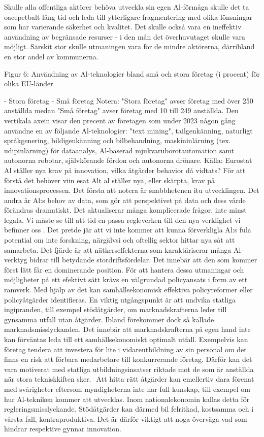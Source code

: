 {{{{{{{{{{{{{{{{{{Skulle alla offentliga aktörer behöva utveckla sin egen Al-förmåga skulle det ta oacepetbalt lång tid och leda till ytterligare fragmentering med olika lönsningar som har varierande säkerhet och kvalitet. Det skulle också vara en ineffektiv användning av begränsade resurser - i den mån det överhuvutaget skulle vara möjligt. Särskit stor skulle utmaningen vara för de mindre aktörerna, därribland en stor andel av kommunerna.

Figur 6: Användning av Al-teknologier bland små och stora företag (i procent) för olika EU-länder

- Stora företag - Små företag
Notera: "Stora företag" avser företag med över 250 anställda medan "Små företag" avser företag med 10 till 249 anställda. Den vertikala axein visar den precent av företagen som under 2023 någon gång användne en av följande Al-teknologier: "text mining", tailgenkänning, naturligt språkgenering, bildigenkänning och bilbehandning, maskininlärning (tex. udipinlärning) för dataanalys, Al-baserad mjukvaruborotautomation samt autonorna robotar, självkörande fördon och autonorna drönare.
Källa: Eurostat
Al ställer nya krav på innovation, vilka åtgärder behavior då vidtats? För att förstå det behöver viin esat Alt al ställer nya, eller skärpta, krav på innovationsprocessen. Det första att notera är snabbhetenen itu utvecklingen. Det andra år Al:s behov av data, som gör att perspektivet på data och dess värde förändras dramatiskt. Det aktualiserar många komplicerade frågor, inte minst legala. Vi måste se till att tid en passa regleverken till den nya verklighet vi befinner oss . Det pretde jär att vi inte kommer att kunna förverkligla Al:s fula potential om inte forskning, närgälvsi och oftellig sektor hittar nya såt att samarbeta. Det fjärde är att nätkerseffekterna som karaktäriserar många Al-verktyg bidrar till betydande stordriftsfördelar. Det innebär att den som kommer först lätt får en dominerande position.
För att hantera dessa utmaningar och möjligheter på ett efektivt sätt krävs en välgrundad policyansats i form av ett ramverk. Med hjälp av det kan samhällsekonomisk effektiva policyreformer eller policyåtgärder identifieras. En viktig utgångspunkt är att undvika statliga ingipranden, till exempel stödåtgärder, om marknadskrafterna leder till gynsamma utfall utan åtgärder. Ibland förekommer dock så kallade marknadsmisslyckanden. Det innebär att marknadskrafterna på egen hand inte kan förväntas leda till ett samhällsekonomiskt optimalt utfall. Exempelvis kan företag tendera att investera för lite i vidareutbildning av sin personal om det finns en risk att förbara medarbetare till konkurrerande företag. Därför kan det vara motiverat med statliga utbildningsinsatser riktade mot de som är anställda när stora tekniskkiften sker. \({ }^{}\) Att hitta rätt åtgärder kan emellertiv dara förenat med svårigheter eftersom myndigheterna inte har full kunskap, till exempel om hur Al-tekniken kommer att utvecklas. Inom nationalekonomin kallas detta för regleringsmisslyckande. Stödåtgärder kan därmed bil felritkad, kostsamma och i vårsta fall, kontraproduktiva. Det är därför viktigt att noga överväga vad som hindrar respektive gynnar innovation.
}}}}}}}}}}}}}}}}}}
